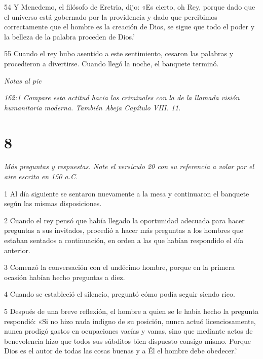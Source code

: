 \par 54 Y Menedemo, el filósofo de Eretria, dijo: «Es cierto, oh Rey, porque dado que el universo está gobernado por la providencia y dado que percibimos correctamente que el hombre es la creación de Dios, se sigue que todo el poder y la belleza de la palabra proceden de Dios.'

\par 55 Cuando el rey hubo asentido a este sentimiento, cesaron las palabras y procedieron a divertirse. Cuando llegó la noche, el banquete terminó.

\par \textit{Notas al pie}

\par \textit{162:1 Compare esta actitud hacia los criminales con la de la llamada visión humanitaria moderna. También Abeja Capítulo VIII. 11.}

\chapter{8}

\par \textit{Más preguntas y respuestas. Note el versículo 20 con su referencia a volar por el aire escrito en 150 a.C.}

\par 1 Al día siguiente se sentaron nuevamente a la mesa y continuaron el banquete según las mismas disposiciones.

\par 2 Cuando el rey pensó que había llegado la oportunidad adecuada para hacer preguntas a sus invitados, procedió a hacer más preguntas a los hombres que estaban sentados a continuación, en orden a las que habían respondido el día anterior.

\par 3 Comenzó la conversación con el undécimo hombre, porque en la primera ocasión habían hecho preguntas a diez.

\par 4 Cuando se estableció el silencio, preguntó cómo podía seguir siendo rico.

\par 5 Después de una breve reflexión, el hombre a quien se le había hecho la pregunta respondió: «Si no hizo nada indigno de su posición, nunca actuó licenciosamente, nunca prodigó gastos en ocupaciones vacías y vanas, sino que mediante actos de benevolencia hizo que todos sus súbditos bien dispuesto consigo mismo. Porque Dios es el autor de todas las cosas buenas y a Él el hombre debe obedecer.'

